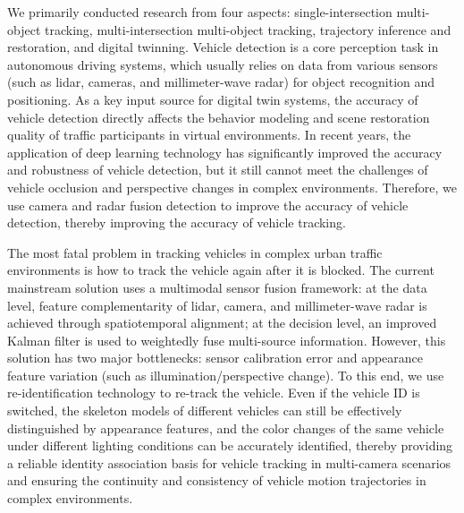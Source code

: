 \documentclass[lettersize,journal]{IEEEtran}
\begin{document}
We primarily conducted research from four aspects: single-intersection multi-object tracking, multi-intersection multi-object tracking, trajectory inference and restoration, and digital twinning. 
Vehicle detection is a core perception task in autonomous driving systems, which usually relies on data from various sensors (such as lidar, cameras, and millimeter-wave radar) for object recognition and positioning. 
As a key input source for digital twin systems, the accuracy of vehicle detection directly affects the behavior modeling and scene restoration quality of traffic participants in virtual environments. 
In recent years, the application of deep learning technology has significantly improved the accuracy and robustness of vehicle detection, but it still cannot meet the challenges of vehicle occlusion and perspective changes in complex environments\cite{Alpher23c}. 
Therefore, we use camera and radar fusion detection to improve the accuracy of vehicle detection, thereby improving the accuracy of vehicle tracking.

The most fatal problem in tracking vehicles in complex urban traffic environments is how to track the vehicle again after it is blocked. 
The current mainstream solution uses a multimodal sensor fusion framework: at the data level, feature complementarity of lidar, camera, and millimeter-wave radar is achieved through spatiotemporal alignment; at the decision level, an improved Kalman filter is used to weightedly fuse multi-source information\cite{Alpher22i}. 
However, this solution has two major bottlenecks: sensor calibration error and appearance feature variation (such as illumination/perspective change). 
To this end, we use re-identification technology to re-track the vehicle. 
Even if the vehicle ID is switched, the skeleton models of different vehicles can still be effectively distinguished by appearance features, and the color changes of the same vehicle under different lighting conditions can be accurately identified, thereby providing a reliable identity association basis for vehicle tracking in multi-camera scenarios and ensuring the continuity and consistency of vehicle motion trajectories in complex environments\cite{Alpher23}.
\end{document}
